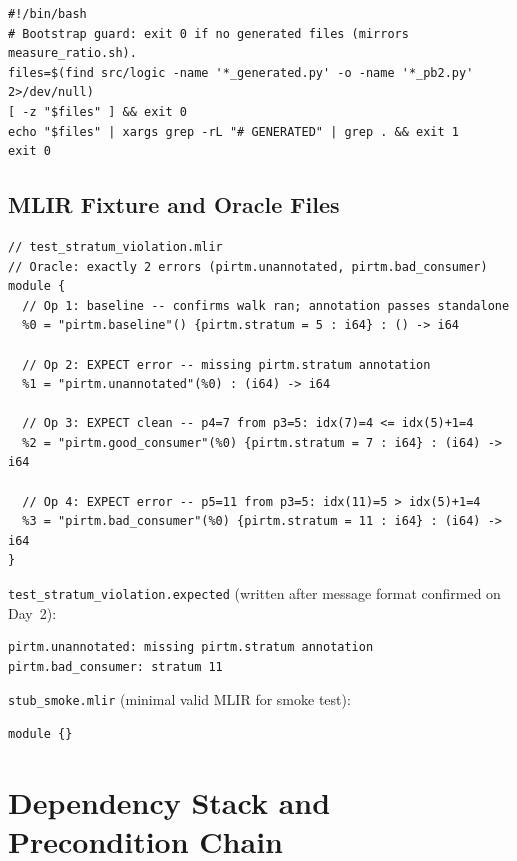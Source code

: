 \documentclass[11pt,letterpaper]{article}
\theoremstyle{pirtmthm}
\theoremstyle{remark}
\begin{document}
\begin{lstlisting}[style=bash,
  caption={check\_generated\_markers.sh --- Generator discipline enforcement}]
#!/bin/bash
# Bootstrap guard: exit 0 if no generated files (mirrors measure_ratio.sh).
files=$(find src/logic -name '*_generated.py' -o -name '*_pb2.py' 2>/dev/null)
[ -z "$files" ] && exit 0
echo "$files" | xargs grep -rL "# GENERATED" | grep . && exit 1
exit 0
\end{lstlisting}

\subsection{MLIR Fixture and Oracle Files}

\begin{lstlisting}[style=mlir,
  caption={test\_stratum\_violation.mlir --- Four-op IDT oracle fixture}]
// test_stratum_violation.mlir
// Oracle: exactly 2 errors (pirtm.unannotated, pirtm.bad_consumer)
module {
  // Op 1: baseline -- confirms walk ran; annotation passes standalone
  %0 = "pirtm.baseline"() {pirtm.stratum = 5 : i64} : () -> i64

  // Op 2: EXPECT error -- missing pirtm.stratum annotation
  %1 = "pirtm.unannotated"(%0) : (i64) -> i64

  // Op 3: EXPECT clean -- p4=7 from p3=5: idx(7)=4 <= idx(5)+1=4
  %2 = "pirtm.good_consumer"(%0) {pirtm.stratum = 7 : i64} : (i64) -> i64

  // Op 4: EXPECT error -- p5=11 from p3=5: idx(11)=5 > idx(5)+1=4
  %3 = "pirtm.bad_consumer"(%0) {pirtm.stratum = 11 : i64} : (i64) -> i64
}
\end{lstlisting}

\noindent
\texttt{test\_stratum\_violation.expected} (written after message format confirmed on Day~2):
\begin{verbatim}
pirtm.unannotated: missing pirtm.stratum annotation
pirtm.bad_consumer: stratum 11
\end{verbatim}

\noindent
\texttt{stub\_smoke.mlir} (minimal valid MLIR for smoke test):
\begin{verbatim}
module {}
\end{verbatim}

\section{Dependency Stack and Precondition Chain}
\end{document}
